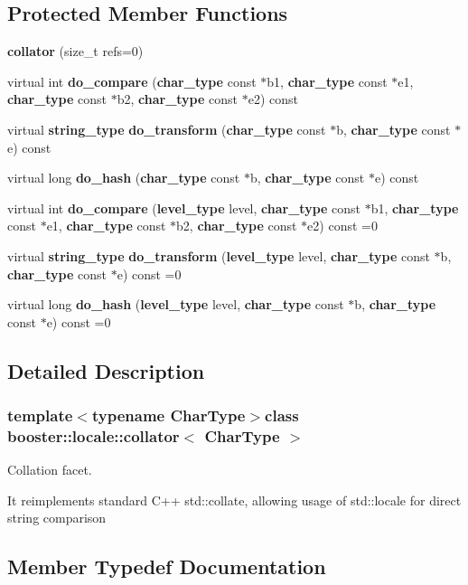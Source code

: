 \subsection*{Protected Member Functions}
\begin{DoxyCompactItemize}
\item 
{\bf collator} (size\-\_\-t refs=0)
\item 
virtual int {\bf do\-\_\-compare} ({\bf char\-\_\-type} const $\ast$b1, {\bf char\-\_\-type} const $\ast$e1, {\bf char\-\_\-type} const $\ast$b2, {\bf char\-\_\-type} const $\ast$e2) const 
\item 
virtual {\bf string\-\_\-type} {\bf do\-\_\-transform} ({\bf char\-\_\-type} const $\ast$b, {\bf char\-\_\-type} const $\ast$e) const 
\item 
virtual long {\bf do\-\_\-hash} ({\bf char\-\_\-type} const $\ast$b, {\bf char\-\_\-type} const $\ast$e) const 
\item 
virtual int {\bf do\-\_\-compare} ({\bf level\-\_\-type} level, {\bf char\-\_\-type} const $\ast$b1, {\bf char\-\_\-type} const $\ast$e1, {\bf char\-\_\-type} const $\ast$b2, {\bf char\-\_\-type} const $\ast$e2) const =0
\item 
virtual {\bf string\-\_\-type} {\bf do\-\_\-transform} ({\bf level\-\_\-type} level, {\bf char\-\_\-type} const $\ast$b, {\bf char\-\_\-type} const $\ast$e) const =0
\item 
virtual long {\bf do\-\_\-hash} ({\bf level\-\_\-type} level, {\bf char\-\_\-type} const $\ast$b, {\bf char\-\_\-type} const $\ast$e) const =0
\end{DoxyCompactItemize}


\subsection{Detailed Description}
\subsubsection*{template$<$typename Char\-Type$>$class booster\-::locale\-::collator$<$ Char\-Type $>$}

Collation facet. 

It reimplements standard C++ std\-::collate, allowing usage of std\-::locale for direct string comparison 

\subsection{Member Typedef Documentation}
